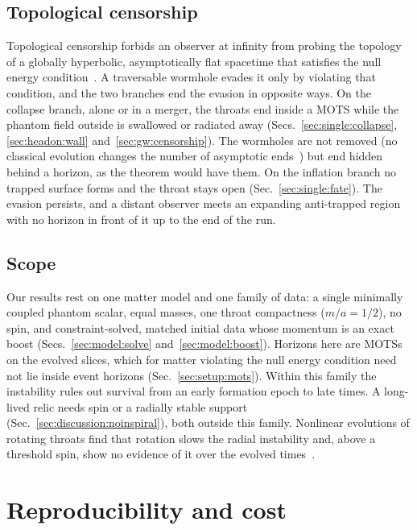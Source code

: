 \documentclass[twocolumn,floatfix,aps,prd,superscriptaddress,nofootinbib,showkeys]{revtex4-2}
\begin{document}
\subsection{Topological censorship}
\label{sec:discussion:topology}

Topological censorship forbids an observer at infinity from probing the topology of a globally hyperbolic, asymptotically flat spacetime that satisfies the null energy condition~\cite{friedman1993}. A traversable wormhole evades it only by violating that condition, and the two branches end the evasion in opposite ways. On the collapse branch, alone or in a merger, the throats end inside a MOTS while the phantom field outside is swallowed or radiated away (Secs.~\ref{sec:single:collapse}, \ref{sec:headon:wall} and~\ref{sec:gw:censorship}). The wormholes are not removed (no classical evolution changes the number of asymptotic ends~\cite{geroch1967}) but end hidden behind a horizon, as the theorem would have them. On the inflation branch no trapped surface forms and the throat stays open (Sec.~\ref{sec:single:fate}). The evasion persists, and a distant observer meets an expanding anti-trapped region with no horizon in front of it up to the end of the run.

\subsection{Scope}
\label{sec:discussion:open}

Our results rest on one matter model and one family of data: a single minimally coupled phantom scalar, equal masses, one throat compactness ($m/a=1/2$), no spin, and constraint-solved, matched initial data whose momentum is an exact boost (Secs.~\ref{sec:model:solve} and~\ref{sec:model:boost}). Horizons here are MOTSs on the evolved slices, which for matter violating the null energy condition need not lie inside event horizons (Sec.~\ref{sec:setup:mots}). Within this family the instability rules out survival from an early formation epoch to late times. A long-lived relic needs spin or a radially stable support (Sec.~\ref{sec:discussion:noinspiral}), both outside this family. Nonlinear evolutions of rotating throats find that rotation slows the radial instability and, above a threshold spin, show no evidence of it over the evolved times~\cite{shirokov2026c}.

\section{Reproducibility and cost}
\label{sec:repro}
\label{sec:cost}
\end{document}
